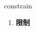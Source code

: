 
\begin{frame}
{\huge constrain}
\begin{center}
\begin{enumerate}\Large
  \item \textbf{限制}
\end{enumerate}
\end{center}
\end{frame}
